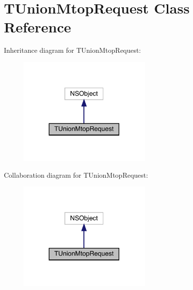 \hypertarget{interface_t_union_mtop_request}{}\section{T\+Union\+Mtop\+Request Class Reference}
\label{interface_t_union_mtop_request}


Inheritance diagram for T\+Union\+Mtop\+Request\+:\nopagebreak
\begin{figure}[H]
\begin{center}
\leavevmode
\includegraphics[width=188pt]{interface_t_union_mtop_request__inherit__graph}
\end{center}
\end{figure}


Collaboration diagram for T\+Union\+Mtop\+Request\+:\nopagebreak
\begin{figure}[H]
\begin{center}
\leavevmode
\includegraphics[width=188pt]{interface_t_union_mtop_request__coll__graph}
\end{center}
\end{figure}
